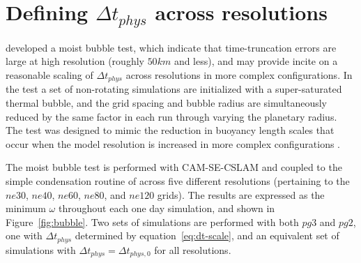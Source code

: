 \documentclass{agujournal}
\begin{document}
\section{Defining $\Delta t_{phys}$ across resolutions}\label{app:dt}
 \cite{HR2018JAMES} developed a moist bubble test, which indicate that time-truncation errors are large at high resolution (roughly $50km$ and less), and may provide incite on a reasonable scaling of $\Delta t_{phys}$ across resolutions in more complex configurations. In the test a set of non-rotating simulations are initialized with a super-saturated thermal bubble, and the grid spacing and bubble radius are simultaneously reduced by the same factor in each run through varying the planetary radius. The test was designed to mimic the reduction in buoyancy length scales that occur when the model resolution is increased in more complex configurations \citep{HETAL2006JCLIM,HR2018JAMES}. 
 
The moist bubble test is performed with CAM-SE-CSLAM and coupled to the simple condensation routine of \cite{K1969MM} across five different resolutions (pertaining to the $ne30$, $ne40$, $ne60$, $ne80$, and $ne120$ grids). The results are expressed as the minimum $\omega$ throughout each one day simulation, and shown in Figure~\ref{fig:bubble}. Two sets of simulations are performed with both $pg3$ and $pg2$, one with $\Delta t_{phys}$ determined by equation~\ref{eq:dt-scale}, and an equivalent set of simulations with $\Delta t_{phys} = \Delta t_{phys,0}$ for all resolutions. 
\end{document}
